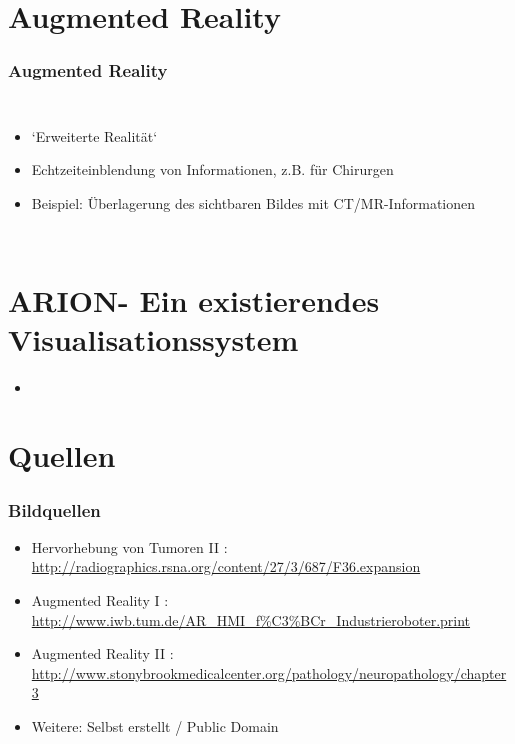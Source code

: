 \documentclass[14pt]{beamer}
\begin{document}
\section{Augmented Reality}
\begin{frame}[allowframebreaks]
\frametitle{Augmented Reality}
\begin{columns}
	    \begin{itemize}
	    \item `Erweiterte Realität`
	    \item Echtzeiteinblendung von Informationen, z.B. für Chirurgen
	    \item Beispiel: Überlagerung des sichtbaren Bildes mit CT/MR-Informationen
	    \end{itemize}
\end{columns}


\end{frame}
%
%
\section{ARION\texttrademark - Ein existierendes Visualisationssystem}
\begin{frame}
\begin{itemize}
\item 
\end{itemize}
 
\end{frame}

%
%
\section{Quellen}
\begin{frame}[shrink]
 \frametitle{Bildquellen}
 \begin{itemize}
  \item Hervorhebung von Tumoren II :\\ \url{http://radiographics.rsna.org/content/27/3/687/F36.expansion}
  \item Augmented Reality I :\\ \url{http://www.iwb.tum.de/AR_HMI_f\%C3\%BCr_Industrieroboter.print}
  \item Augmented Reality II :\\ \url{http://www.stonybrookmedicalcenter.org/pathology/neuropathology/chapter3}
  \item Weitere: Selbst erstellt / Public Domain
 \end{itemize}
 
\end{frame}
\end{document}
